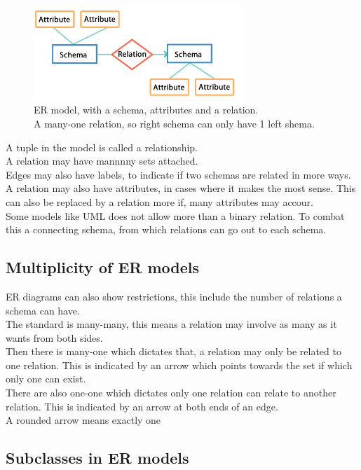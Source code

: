 \documentclass[12pt, a4paper]{article}
\begin{document}
		\begin{figure}[h!]
			\centering
			\caption{ER model, with a schema, attributes and a relation.\\ A many-one relation, so right schema can only have 1 left shema.}
			\includegraphics[width=300px]{assets/ERModel.png}
		\end{figure}
		A tuple in the model is called a relationship.\\
		A relation may have mannnny sets attached.\\
		Edges may also have labels, to indicate if two schemas are related in more ways.\\
		A relation may also have attributes, in cases where it makes the most sense. This can also be replaced by a relation more if, many attributes may accour.\\
		Some models like UML does not allow more than a binary relation. To combat this a connecting schema, from which relations can go out to each schema.
		\subsection{Multiplicity of ER models}
				  ER diagrams can also show restrictions, this include the number of relations a schema can have.\\
				  The standard is many-many, this means a relation may involve as many as it wants from both sides.\\
				  Then there is many-one which dictates that, a relation may only be related to one relation. This is indicated by an arrow which points towards the set if which only one can exist.\\
				  There are also one-one which dictates only one relation can relate to another relation. This is indicated by an arrow at both ends of an edge.\\
				  A rounded arrow means exactly one
		\subsection{Subclasses in ER models}
		
\end{document}
